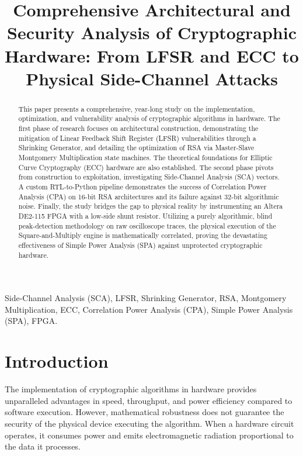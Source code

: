 \documentclass[conference, a4paper]{IEEEtran}
\begin{document}
\title{Comprehensive Architectural and Security Analysis of Cryptographic Hardware: From LFSR and ECC to Physical Side-Channel Attacks}

\author{
}

\maketitle

\begin{abstract}
This paper presents a comprehensive, year-long study on the implementation, optimization, and vulnerability analysis of cryptographic algorithms in hardware. The first phase of research focuses on architectural construction, demonstrating the mitigation of Linear Feedback Shift Register (LFSR) vulnerabilities through a Shrinking Generator, and detailing the optimization of RSA via Master-Slave Montgomery Multiplication state machines. The theoretical foundations for Elliptic Curve Cryptography (ECC) hardware are also established. The second phase pivots from construction to exploitation, investigating Side-Channel Analysis (SCA) vectors. A custom RTL-to-Python pipeline demonstrates the success of Correlation Power Analysis (CPA) on 16-bit RSA architectures and its failure against 32-bit algorithmic noise. Finally, the study bridges the gap to physical reality by instrumenting an Altera DE2-115 FPGA with a low-side shunt resistor. Utilizing a purely algorithmic, blind peak-detection methodology on raw oscilloscope traces, the physical execution of the Square-and-Multiply engine is mathematically correlated, proving the devastating effectiveness of Simple Power Analysis (SPA) against unprotected cryptographic hardware.
\end{abstract}

\begin{IEEEkeywords}
Side-Channel Analysis (SCA), LFSR, Shrinking Generator, RSA, Montgomery Multiplication, ECC, Correlation Power Analysis (CPA), Simple Power Analysis (SPA), FPGA.
\end{IEEEkeywords}

\section{Introduction}
The implementation of cryptographic algorithms in hardware provides unparalleled advantages in speed, throughput, and power efficiency compared to software execution. However, mathematical robustness does not guarantee the security of the physical device executing the algorithm. When a hardware circuit operates, it consumes power and emits electromagnetic radiation proportional to the data it processes.
\end{document}
